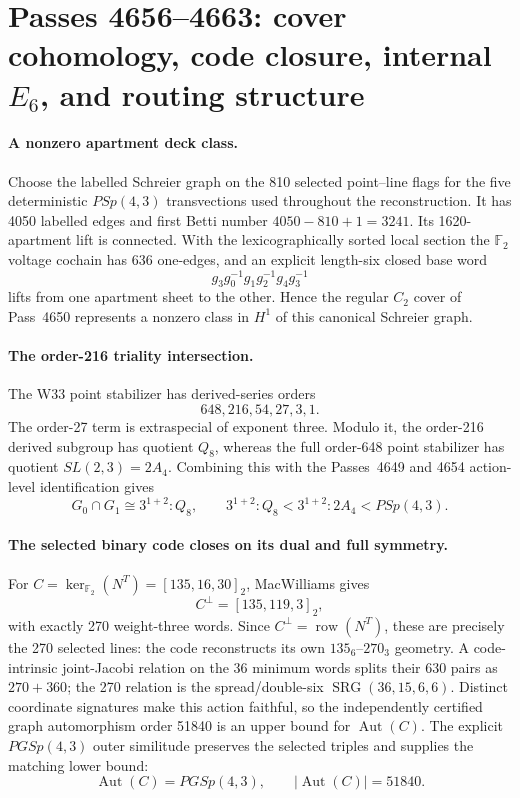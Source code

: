 \section*{Passes 4656--4663: cover cohomology, code closure, internal $E_6$, and routing structure}
\paragraph{A nonzero apartment deck class.}
Choose the labelled Schreier graph on the 810 selected point--line flags for the five deterministic $PSp(4,3)$ transvections used throughout the reconstruction.  It has 4050 labelled edges and first Betti number $4050-810+1=3241$.  Its 1620-apartment lift is connected.  With the lexicographically sorted local section the $\mathbb F_2$ voltage cochain has 636 one-edges, and an explicit length-six closed base word
\[
 g_3g_0^{-1}g_1g_2^{-1}g_4g_3^{-1}
\]
lifts from one apartment sheet to the other.  Hence the regular $C_2$ cover of Pass~4650 represents a nonzero class in $H^1$ of this canonical Schreier graph.

\paragraph{The order-216 triality intersection.}
The W33 point stabilizer has derived-series orders
\[
648,216,54,27,3,1.
\]
The order-27 term is extraspecial of exponent three.  Modulo it, the order-216 derived subgroup has quotient $Q_8$, whereas the full order-648 point stabilizer has quotient $SL(2,3)=2A_4$.  Combining this with the Passes~4649 and 4654 action-level identification gives
\[
G_0\cap G_1\cong 3^{1+2}\!:\!Q_8,
\qquad
3^{1+2}\!:\!Q_8<3^{1+2}\!:\!2A_4<PSp(4,3).
\]

\paragraph{The selected binary code closes on its dual and full symmetry.}
For $C=\ker_{\mathbb F_2}(N^T)=[135,16,30]_2$, MacWilliams gives
\[
C^\perp=[135,119,3]_2,
\]
with exactly 270 weight-three words.  Since $C^\perp=\operatorname{row}(N^T)$, these are precisely the 270 selected lines: the code reconstructs its own $135_6$--$270_3$ geometry.  A code-intrinsic joint-Jacobi relation on the 36 minimum words splits their 630 pairs as $270+360$; the 270 relation is the spread/double-six $\operatorname{SRG}(36,15,6,6)$.  Distinct coordinate signatures make this action faithful, so the independently certified graph automorphism order 51840 is an upper bound for $\operatorname{Aut}(C)$.  The explicit $PGSp(4,3)$ outer similitude preserves the selected triples and supplies the matching lower bound:
\[
\operatorname{Aut}(C)=PGSp(4,3),\qquad |\operatorname{Aut}(C)|=51840.
\]

